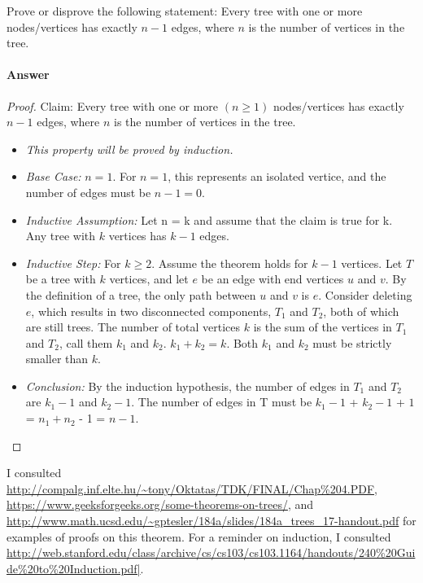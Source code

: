 \documentclass{article}
\begin{document}

Prove or disprove the following statement: Every tree with one or more
nodes/vertices has exactly $n-1$ edges, where $n$ is the number of vertices in
the tree.

\paragraph{Answer}
\begin{proof}{Claim:}{ Every tree with one or more $(n \geq 1)$ nodes/vertices has exactly $n-1$ edges, where $n$ is the number of vertices in the tree.} 
\begin{itemize}
\item \emph{This property will be proved by induction.} 
\item \emph{Base Case:}{ $n = 1$. For $n = 1$, this represents an isolated vertice, and the number of edges must be $n - 1 = 0$.}
\item \emph{Inductive Assumption:}{ Let n = k and assume that the claim is true for k. Any tree with $k$ vertices has $k-1$ edges.}
\item \emph{Inductive Step:}{ For $k \geq 2$. Assume the theorem holds for $k-1$ vertices. Let $T$ be a tree with $k$ vertices, and let $e$ be an edge with end vertices $u$ and $v$. By the definition of a tree, the only path between $u$ and $v$ is $e$. Consider deleting $e$, which results in two disconnected components, $T_1$ and $T_2$, both of which are still trees. The number of total vertices $k$ is the sum of the vertices in $T_1$ and $T_2$, call them $k_1$ and $k_2$. $k_1 + k_2 = k$. Both $k_1$ and $k_2$ must be strictly smaller than $k$.} 
\item \emph{Conclusion:}{ By the induction hypothesis, the number of edges in $T_1$ and $T_2$ are $k_1 - 1$ and $k_2 - 1$. The number of edges in T must be $k_1 - 1$ + $k_2 - 1$ + $1$ = $n_1 + n_2$ - 1 = $n - 1$.}
\end{itemize}
\end{proof}

I consulted \url{http://compalg.inf.elte.hu/~tony/Oktatas/TDK/FINAL/Chap\%204.PDF}, \url{https://www.geeksforgeeks.org/some-theorems-on-trees/}, and \url{http://www.math.ucsd.edu/~gptesler/184a/slides/184a_trees_17-handout.pdf} for examples of proofs on this theorem. For a reminder on induction, I consulted \url{http://web.stanford.edu/class/archive/cs/cs103/cs103.1164/handouts/240\%20Guide\%20to\%20Induction.pdf|}.
\end{document}
